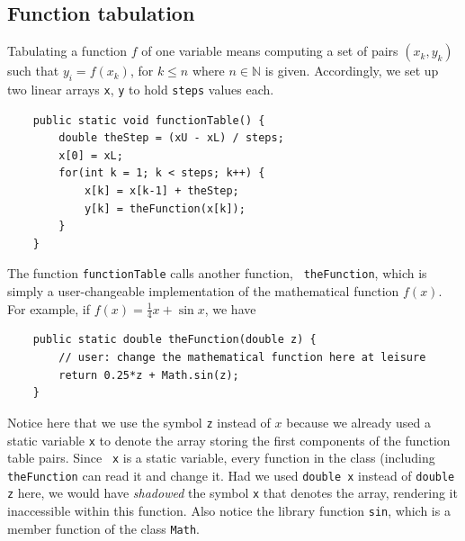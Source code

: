 \documentclass[a4paper]{book}
\theoremstyle{changebreak}                %
\begin{document}
\subsection{Function tabulation}
Tabulating a function $f$ of one variable means computing a set of
pairs $(x_k,y_k)$ such that $y_i=f(x_k)$, for $k\le n$ where
$n\in\mathbb{N}$ is given. Accordingly, we set up two linear
arrays {\tt x}, {\tt y} to hold {\tt steps} values
each.
\begin{verbatim}
    public static void functionTable() {
        double theStep = (xU - xL) / steps;
        x[0] = xL;
        for(int k = 1; k < steps; k++) {
            x[k] = x[k-1] + theStep;
            y[k] = theFunction(x[k]);
        }	
    }
\end{verbatim}
The function {\tt functionTable} calls another function, {\tt
  theFunction}, which is simply a user-changeable
implementation of the mathematical function $f(x)$. For example, if
$f(x)=\frac{1}{4}x+\sin x$, we have
\begin{verbatim}
    public static double theFunction(double z) {
        // user: change the mathematical function here at leisure
        return 0.25*z + Math.sin(z); 
    }
\end{verbatim}
Notice here that we use the symbol {\tt z} instead of $x$ because we
already used a static variable {\tt x} to
denote the array storing the first
components of the function table pairs. Since {\tt
  x} is a static variable, every function in the class (including {\tt
  theFunction} can read it and change it. Had we used {\tt double x}
instead of {\tt double z} here, we would have {\it
  shadowed} the symbol {\tt x} that denotes the
array, rendering it inaccessible within this function. Also notice the
library function {\tt sin}, which is a member function
of the class {\tt Math}.
\end{document}

